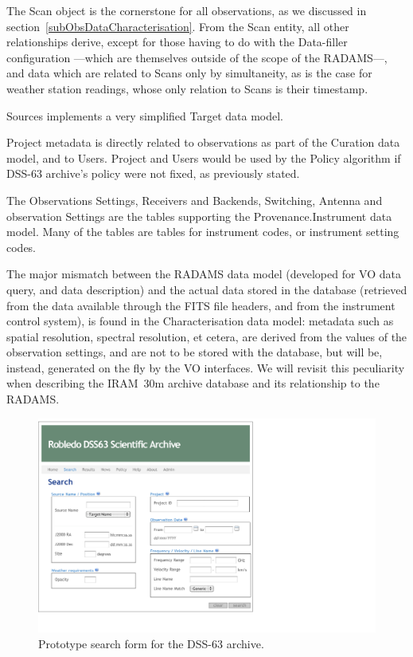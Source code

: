 			The Scan object is the cornerstone for
			all observations, as we discussed in
			section~\ref{subObsDataCharacterisation}. From the
			Scan entity, all other relationships derive, except
			for those having to do with the Data-filler
			configuration ---which are themselves outside of the
			scope of the RADAMS---, and data which are related to
			Scans only by simultaneity, as is the case for
			weather station readings, whose only relation to
			Scans is their timestamp.
			
			Sources implements a very simplified Target data model.
			
			Project metadata is directly related to observations
			as part of the Curation data model, and to Users.
			Project and Users would be used by the Policy algorithm
			if DSS-63 archive's policy were not fixed, as
			previously stated.
			
			The Observations Settings, Receivers and Backends,
			Switching, Antenna and observation Settings are the
			tables supporting
			the Provenance.Instrument data model. Many of the tables
			are tables for instrument codes, or instrument setting
			codes.
			
			The major mismatch between the RADAMS data model
			(developed for VO data query, and data description)
			and the actual data stored in the database (retrieved
			from the data available through the FITS file headers,
			and from the instrument control system), is found in
			the Characterisation data model: metadata such as
			spatial resolution, spectral resolution, et cetera,
			are derived from the values of the observation
			settings, and are not to be stored with the database,
			but will be, instead, generated on the fly by the
			VO interfaces. We will revisit this peculiarity when
			describing the IRAM~30m archive database and its
			relationship to the RADAMS.
			
			\begin{figure}[tbp]
				\centering
					\includegraphics[width=\textwidth]
					{fig/DSS63_searchForm.pdf}
				\caption{
					Prototype search form for the DSS-63 archive.
				}
				\label{fig:fig_DSS63_searchForm}
			\end{figure}
			
